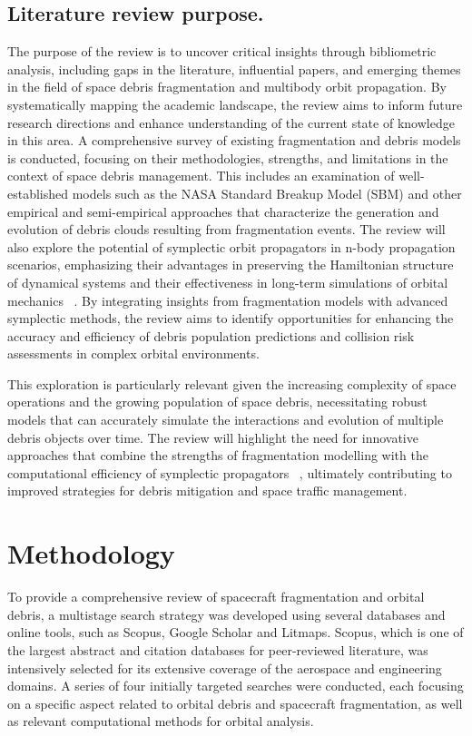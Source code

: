 \documentclass[journal ]{new-aiaa}
\begin{document}
\subsection{Literature review purpose.}

The purpose of the review is to uncover critical insights through bibliometric analysis, including gaps in the literature, influential papers, and emerging themes in the field of space debris fragmentation and multibody orbit propagation. By systematically mapping the academic landscape, the review aims to inform future research directions and enhance understanding of the current state of knowledge in this area. A comprehensive survey of existing fragmentation and debris models is conducted, focusing on their methodologies, strengths, and limitations in the context of space debris management. This includes an examination of well-established models such as the NASA Standard Breakup Model (SBM) and other empirical and semi-empirical approaches that characterize the generation and evolution of debris clouds resulting from fragmentation events. The review will also explore the potential of symplectic orbit propagators in n-body propagation scenarios, emphasizing their advantages in preserving the Hamiltonian structure of dynamical systems and their effectiveness in long-term simulations of orbital mechanics ~\cite{hubaux_symplectic_2012}. By integrating insights from fragmentation models with advanced symplectic methods, the review aims to identify opportunities for enhancing the accuracy and efficiency of debris population predictions and collision risk assessments in complex orbital environments.

This exploration is particularly relevant given the increasing complexity of space operations and the growing population of space debris, necessitating robust models that can accurately simulate the interactions and evolution of multiple debris objects over time. The review will highlight the need for innovative approaches that combine the strengths of fragmentation modelling with the computational efficiency of symplectic propagators ~\cite{cintio_symplectic_2017}, ultimately contributing to improved strategies for debris mitigation and space traffic management.

\section{Methodology}

To provide a comprehensive review of spacecraft fragmentation and orbital debris, a multistage search strategy was developed using several databases and online tools, such as Scopus, Google Scholar and Litmaps. Scopus, which is one of the largest abstract and citation databases for peer-reviewed literature, was intensively selected for its extensive coverage of the aerospace and engineering domains. A series of four initially targeted searches were conducted, each focusing on a specific aspect related to orbital debris and spacecraft fragmentation, as well as relevant computational methods for orbital analysis.
\end{document}
